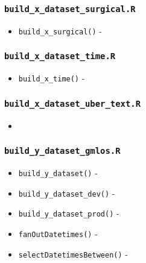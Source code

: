 \documentclass[
]{book}
\providecommand{\tightlist}{%
  \setlength{\itemsep}{0pt}\setlength{\parskip}{0pt}}
\begin{document}
\hypertarget{build_x_dataset_surgical.r}{%
\subsubsection{\texorpdfstring{\texttt{build\_x\_dataset\_surgical.R}}{build\_x\_dataset\_surgical.R}}\label{build_x_dataset_surgical.r}}

\begin{itemize}
\tightlist
\item
  \texttt{build\_x\_surgical()} -
\end{itemize}

\hypertarget{build_x_dataset_time.r}{%
\subsubsection{\texorpdfstring{\texttt{build\_x\_dataset\_time.R}}{build\_x\_dataset\_time.R}}\label{build_x_dataset_time.r}}

\begin{itemize}
\tightlist
\item
  \texttt{build\_x\_time()} -
\end{itemize}

\hypertarget{build_x_dataset_uber_text.r}{%
\subsubsection{\texorpdfstring{\texttt{build\_x\_dataset\_uber\_text.R}}{build\_x\_dataset\_uber\_text.R}}\label{build_x_dataset_uber_text.r}}

\begin{itemize}
\item
\end{itemize}

\hypertarget{build_y_dataset_gmlos.r}{%
\subsubsection{\texorpdfstring{\texttt{build\_y\_dataset\_gmlos.R}}{build\_y\_dataset\_gmlos.R}}\label{build_y_dataset_gmlos.r}}

\begin{itemize}
\tightlist
\item
  \texttt{build\_y\_dataset()} -
\item
  \texttt{build\_y\_dataset\_dev()} -
\item
  \texttt{build\_y\_dataset\_prod()} -
\item
  \texttt{fanOutDatetimes()} -
\item
  \texttt{selectDatetimesBetween()} -
\end{itemize}
\end{document}
